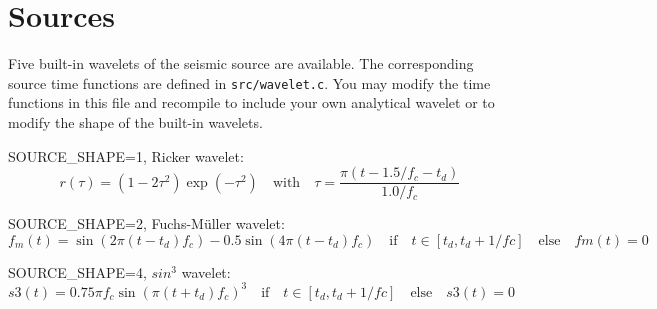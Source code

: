 \newpage


\section{Sources}
\label{sec:sources}
{\color{blue}{\begin{verbatim}
"Source" : "comment",
			"SOURCE_SHAPE" : "4",
			"SOURCE_SHAPE values: ricker=1;fumue=2;from_SIGNAL_FILE=3;SIN**3=4;
			Gaussian_deriv=5;Spike=6;from_SIGNAL_FILE_in_su_format=7" : "comment",
			"SIGNAL_FILE" : "./ormsby.dat",
			
			"SOURCE_TYPE" : "3",
			"SOURCE_TYPE values (point_source): explosive=1;force_in_x=2;force_in_y=3;
			rotated_force=4" : "comment",
			
			"SRCREC" : "1",
			"SRCREC values : read source positions from SOURCE_FILE=1,
			 PLANE_WAVE=2" : "comment",
			 
			"SOURCE_FILE" : "./source/sources.dat",
			"RUN_MULTIPLE_SHOTS" : "1",
			
			"PLANE_WAVE_DEPTH" : "0.0",
			"PHI" : "0.0",
			"TS" : "0.032",
\end{verbatim}}}

{\color{red}{\begin{verbatim}
Default values are:
	SRCREC=1
\end{verbatim}}}

Five built-in wavelets of the seismic source are available. The corresponding source time functions are defined in \texttt{src/wavelet.c}. You may modify the time functions in this file and recompile to include your
own analytical wavelet or to modify the shape of the built-in wavelets.
\newline

SOURCE\_SHAPE=1, Ricker wavelet:
\begin{equation}
r(\tau)=\left(1-2\tau^2\right)\exp(-\tau^2) \quad \mbox{with} \quad \tau=\frac{\pi(t-1.5/f_c-t_d)}{1.0/f_c}
\label{eq_ricker}
\end{equation}

SOURCE\_SHAPE=2, Fuchs-M\"uller wavelet:
\begin{equation}
f_m(t)=\sin(2\pi(t-t_d)f_c)-0.5\sin(4\pi(t-t_d)f_c) \quad \mbox{if} \quad t\in[t_d,t_d+1/fc] \quad \mbox{else} \quad fm(t)=0
\label{eq_fm}
\end{equation}

SOURCE\_SHAPE=4, $sin^3$ wavelet:
\begin{equation}
s3(t)=0.75 \pi f_c \sin(\pi(t+t_d)f_c)^3\quad \mbox{if} \quad t \in[t_d,t_d+1/fc] \quad \mbox{else} \quad s3(t)=0
\label{eq_s3}
\end{equation}

